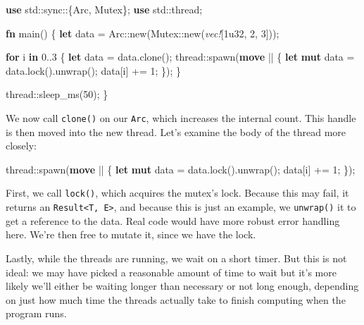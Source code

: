 \documentclass[a4paper,]{book}
\newenvironment{Shaded}{\begin{snugshade}}{\end{snugshade}}
\newcommand{\KeywordTok}[1]{\textcolor[rgb]{0.13,0.29,0.53}{\textbf{{#1}}}}
\newcommand{\DecValTok}[1]{\textcolor[rgb]{0.00,0.00,0.81}{{#1}}}
\newcommand{\PreprocessorTok}[1]{\textcolor[rgb]{0.56,0.35,0.01}{\textit{{#1}}}}
\newcommand{\NormalTok}[1]{{#1}}
\begin{document}
\begin{Shaded}
\begin{Highlighting}[]
\KeywordTok{use} \NormalTok{std::sync::\{Arc, Mutex\};}
\KeywordTok{use} \NormalTok{std::thread;}

\KeywordTok{fn} \NormalTok{main() \{}
    \KeywordTok{let} \NormalTok{data = Arc::new(Mutex::new(}\PreprocessorTok{vec!}\NormalTok{[}\DecValTok{1u32}\NormalTok{, }\DecValTok{2}\NormalTok{, }\DecValTok{3}\NormalTok{]));}

    \KeywordTok{for} \NormalTok{i }\KeywordTok{in} \DecValTok{0.}\NormalTok{.}\DecValTok{3} \NormalTok{\{}
        \KeywordTok{let} \NormalTok{data = data.clone();}
        \NormalTok{thread::spawn(}\KeywordTok{move} \NormalTok{|| \{}
            \KeywordTok{let} \KeywordTok{mut} \NormalTok{data = data.lock().unwrap();}
            \NormalTok{data[i] += }\DecValTok{1}\NormalTok{;}
        \NormalTok{\});}
    \NormalTok{\}}

    \NormalTok{thread::sleep_ms(}\DecValTok{50}\NormalTok{);}
\NormalTok{\}}
\end{Highlighting}
\end{Shaded}

We now call \texttt{clone()} on our \texttt{Arc}, which increases the
internal count. This handle is then moved into the new thread. Let's
examine the body of the thread more closely:

\begin{Shaded}
\begin{Highlighting}[]
\NormalTok{thread::spawn(}\KeywordTok{move} \NormalTok{|| \{}
    \KeywordTok{let} \KeywordTok{mut} \NormalTok{data = data.lock().unwrap();}
    \NormalTok{data[i] += }\DecValTok{1}\NormalTok{;}
\NormalTok{\});}
\end{Highlighting}
\end{Shaded}

First, we call \texttt{lock()}, which acquires the mutex's lock. Because
this may fail, it returns an
\texttt{Result\textless{}T,\ E\textgreater{}}, and because this is just
an example, we \texttt{unwrap()} it to get a reference to the data. Real
code would have more robust error handling here. We're then free to
mutate it, since we have the lock.

Lastly, while the threads are running, we wait on a short timer. But
this is not ideal: we may have picked a reasonable amount of time to
wait but it's more likely we'll either be waiting longer than necessary
or not long enough, depending on just how much time the threads actually
take to finish computing when the program runs.
\end{document}
